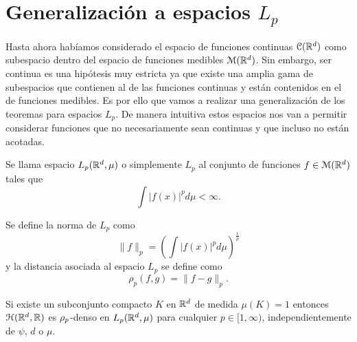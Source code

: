 %
\section{Generalización a espacios $L_p$}  

Hasta ahora habíamos considerado el espacio de funciones continuas 
$\mathcal{C}(\mathbb{R}^d)$ 
como subespacio dentro del espacio de funciones medibles $\mathcal{M}(\mathbb{R}^d)$. 
Sin embargo, ser continua es una hipótesis muy estricta ya que existe una amplia gama de subespacios que contienen al de 
las funciones continuas y están contenidos en el de funciones medibles. 
Es por ello que vamos a realizar una generalización de los teoremas
para espacios $L_p$. De manera intuitiva estos espacios nos van a 
permitir considerar funciones que no necesariamente sean continuas
y que incluso no están acotadas. 

 \normalmarginpar
\begin{definicion}[Espacios Lp]
    Se llama espacio $L_p(\mathbb{R}^d, \mu)$ o simplemente $L_p$ al conjunto 
    de funciones $f \in \mathcal{M}(\mathbb{R}^d)$ tales que 
    \begin{equation}
        \int |f(x)|^p d\mu < \infty. 
    \end{equation}

   
Se define la norma de $L_p$ como 
\begin{equation}
    \| f\|_p 
    =
    \left(\int |f(x)|^p d\mu \right)^\frac{1}{p}
\end{equation}
y la distancia asociada al espacio $L_p$ se define como 
\begin{equation}
    \rho_p(f,g) = \| f-g\|_p.
\end{equation}
\end{definicion}


\begin{corolario}\label{corolario:2_2_rrnn}
    Si existe un subconjunto compacto $K$ en $\mathbb{R}^d$ de medida
    $\mu(K) =1$ entonces $\mathcal{H}(\mathbb{R}^d,\mathbb{R})$ es $\rho_{p}$-denso en $L_p(\mathbb{R}^d, \mu)$
    para cualquier $p \in [1,\infty)$, independientemente de 
    $\psi$, $d$ o $\mu$.
\end{corolario}

